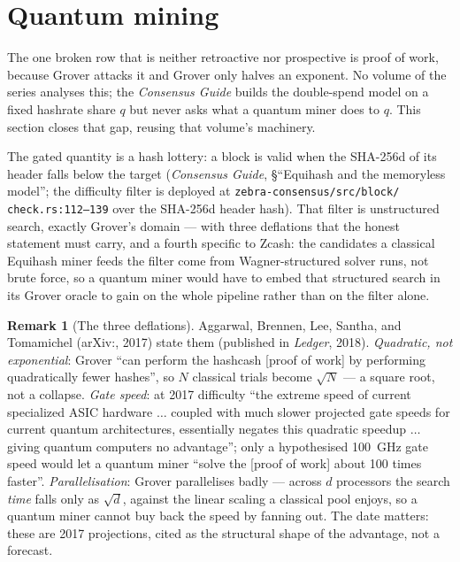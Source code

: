 \documentclass[11pt,a4paper]{article}
\theoremstyle{definition}
\newtheorem{remark}[theorem]{Remark}
\begin{document}
\section{Quantum mining}\label{sec:pq-mining}

The one broken row that is neither retroactive nor prospective is proof
of work, because Grover attacks it and Grover only halves an exponent.
No volume of the series analyses this; the \emph{Consensus Guide} builds
the double-spend model on a fixed hashrate share $q$ but never asks what
a quantum miner does to $q$. This section closes that gap, reusing that
volume's machinery.

The gated quantity is a hash lottery: a block is valid when the
SHA-256d of its header falls below the target (\emph{Consensus Guide},
\S``Equihash and the memoryless model''; the difficulty filter is
deployed at \texttt{zebra-consensus/src/block/\allowbreak
check.rs:112--139} over the SHA-256d header hash). That filter is
unstructured search, exactly Grover's domain --- with three deflations
that the honest statement must carry, and a fourth specific to Zcash:
the candidates a classical Equihash miner feeds the filter come from
Wagner-structured solver runs, not brute force, so a quantum miner
would have to embed that structured search in its Grover oracle to gain
on the whole pipeline rather than on the filter alone.

\begin{remark}[The three deflations]\label{rem:pq-grover-caveats}
Aggarwal, Brennen, Lee, Santha, and Tomamichel (arXiv:, 2017)
state them (published in \emph{Ledger}, 2018). \emph{Quadratic, not
exponential}: Grover ``can perform the hashcash [proof of work] by
performing quadratically fewer hashes'', so $N$ classical trials become
$\sqrt{N}$ --- a square root, not a collapse. \emph{Gate speed}: at 2017
difficulty ``the extreme speed of
current specialized ASIC hardware $\ldots$ coupled with much slower
projected gate speeds for current quantum architectures, essentially
negates this quadratic speedup $\ldots$ giving quantum computers no
advantage''; only a hypothesised 100~GHz gate speed would let a quantum
miner ``solve the [proof of work] about 100 times faster''.
\emph{Parallelisation}: Grover parallelises badly --- across $d$
processors the search \emph{time} falls only as $\sqrt{d}$, against the
linear scaling a classical pool enjoys, so a quantum miner cannot buy
back the speed by fanning out. The date matters: these are 2017
projections, cited as the structural shape of the advantage, not a
forecast.
\end{remark}
\end{document}
